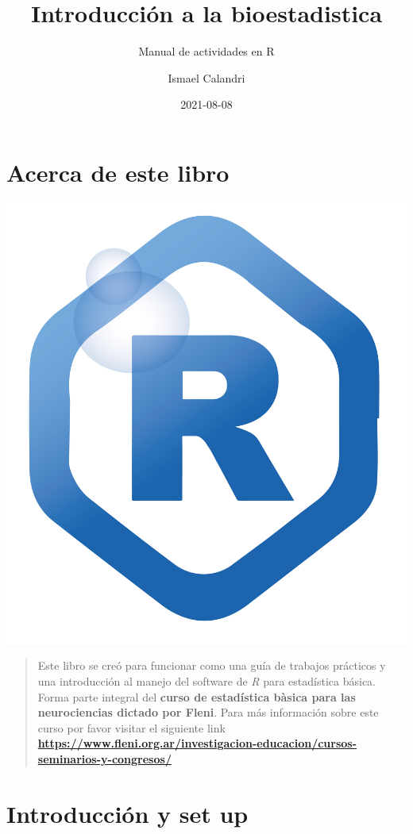 \documentclass[
]{book}
\title{Introducción a la bioestadistica}
\subtitle{Manual de actividades en R}
\author{Ismael Calandri}
\date{2021-08-08}
\begin{document}
\maketitle

{
\setcounter{tocdepth}{1}
\tableofcontents
}
\hypertarget{acerca-de-este-libro}{%
\chapter{Acerca de este libro}\label{acerca-de-este-libro}}

\includegraphics{img/logofleni.png}

\begin{quote}
Este libro se creó para funcionar como una guía de trabajos prácticos y una introducción al manejo del software de \emph{R} para estadística básica. Forma parte integral del \textbf{curso de estadística bàsica para las neurociencias dictado por Fleni}.
Para más información sobre este curso por favor visitar el siguiente link \textbf{\url{https://www.fleni.org.ar/investigacion-educacion/cursos-seminarios-y-congresos/}}
\end{quote}

\hypertarget{introducciuxf3n-y-set-up}{%
\chapter{Introducción y set up}\label{introducciuxf3n-y-set-up}}
\end{document}
